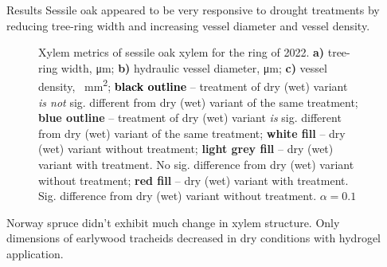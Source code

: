 \documentclass[final]{beamer}
\newlength{\sepwidth}
\newlength{\colwidth}
\newcommand{\separatorcolumn}{\begin{column}{\sepwidth}\end{column}}
\begin{document}
\begin{frame}[t]
\begin{columns}[t]
\begin{column}{\colwidth}
\end{column}


\begin{column}{\colwidth}

\begin{block}{Results}
Sessile oak appeared to be very responsive to drought treatments by reducing tree-ring width and increasing vessel diameter and vessel density.

\begin{figure}
    
    \caption{
        Xylem metrics of sessile oak xylem for the ring of 2022.
        \textbf{a)} tree-ring width, \si{\micro\meter};
        \textbf{b)} hydraulic vessel diameter, \si{\micro\meter};
        \textbf{c)} vessel density, \si{\per\milli\meter\squared};
        \textbf{\textcolor{black}{black outline}} -- treatment of dry (wet) variant \emph{is not} sig. different from dry (wet) variant of the same treatment;
        \textbf{\textcolor[RGB]{31,120,180}{blue outline}} -- treatment of dry (wet) variant \emph{is} sig. different from dry (wet) variant of the same treatment;
        \textbf{\colorbox{white}{white fill}} -- dry (wet) variant without treatment;
        \textbf{\colorbox{gray!10}{light grey fill}} -- dry (wet) variant with treatment. No sig. difference from dry (wet) variant without treatment;
        \textbf{\colorbox[RGB]{251,154,153}{red fill}} -- dry (wet) variant with treatment. Sig. difference from dry (wet) variant without treatment.
        $\alpha = 0.1$
    }
    \label{fig:oak_box}
\end{figure}

Norway spruce didn't exhibit much change in xylem structure. Only dimensions of earlywood tracheids decreased in dry conditions with hydrogel application.


\end{block}
\end{column}
\end{columns}
\end{frame}
\end{document}
